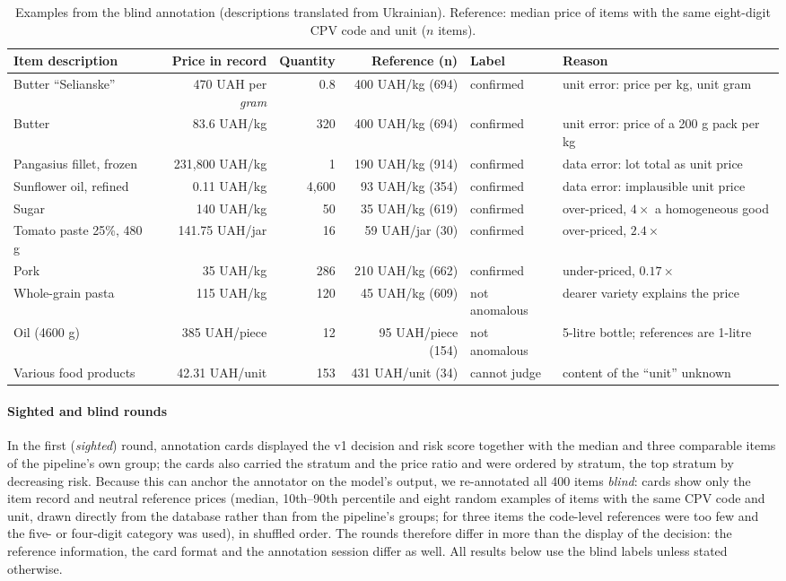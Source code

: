 \documentclass[conference]{IEEEtran}
\begin{document}
\begin{table}[t]
\caption{Examples from the blind annotation (descriptions translated from Ukrainian). Reference: median
price of items with the same eight-digit CPV code and unit ($n$ items).}
\label{tab:examples}
\centering
\footnotesize
\begin{tabular}{@{}lrrrll@{}}
\toprule
Item description & Price in record & Quantity & Reference (n) & Label & Reason \\
\midrule
Butter ``Selianske'' & 470 UAH per \emph{gram} & 0.8 & 400 UAH/kg (694) & confirmed & unit error: price per kg, unit gram \\
Butter & 83.6 UAH/kg & 320 & 400 UAH/kg (694) & confirmed & unit error: price of a 200 g pack per kg \\
Pangasius fillet, frozen & 231{,}800 UAH/kg & 1 & 190 UAH/kg (914) & confirmed & data error: lot total as unit price \\
Sunflower oil, refined & 0.11 UAH/kg & 4{,}600 & 93 UAH/kg (354) & confirmed & data error: implausible unit price \\
Sugar & 140 UAH/kg & 50 & 35 UAH/kg (619) & confirmed & over-priced, $4\times$ a homogeneous good \\
Tomato paste 25\%, 480 g & 141.75 UAH/jar & 16 & 59 UAH/jar (30) & confirmed & over-priced, $2.4\times$ \\
Pork & 35 UAH/kg & 286 & 210 UAH/kg (662) & confirmed & under-priced, $0.17\times$ \\
Whole-grain pasta & 115 UAH/kg & 120 & 45 UAH/kg (609) & not anomalous & dearer variety explains the price \\
Oil (4600 g) & 385 UAH/piece & 12 & 95 UAH/piece (154) & not anomalous & 5-litre bottle; references are 1-litre \\
Various food products & 42.31 UAH/unit & 153 & 431 UAH/unit (34) & cannot judge & content of the ``unit'' unknown \\
\bottomrule
\end{tabular}
\end{table}

\paragraph{Sighted and blind rounds} In the first (\emph{sighted}) round, annotation cards displayed the
v1 decision and risk score together with the median and three comparable items of the pipeline's own
group; the cards also carried the stratum and the price ratio and were ordered by stratum, the top stratum
by decreasing risk. Because this can anchor the annotator on the model's output, we re-annotated all 400 items
\emph{blind}: cards show only the item record and neutral reference prices (median, 10th--90th percentile
and eight random examples of items with the same CPV code and unit, drawn directly from the database rather
than from the pipeline's groups; for three items the code-level references were too few and the five- or
four-digit category was used), in shuffled order. The rounds therefore differ in more than the display
of the decision: the reference information, the card format and the annotation session differ as well. All
results below use the blind labels unless stated otherwise.
\end{document}
